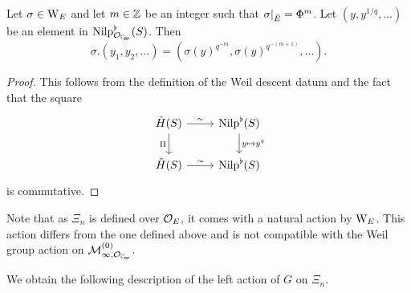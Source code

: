 \documentclass[../main.tex]{subfiles}
\begin{document}
\begin{lem}\label{lem:ExplicitWeilGroupActionOnTildeH}
  Let $\sigma \in \mathrm W_E$ and let $m \in \mathbb{Z}$ be an integer such that
  $\sigma|_{\breve {E}} = \Phi^m$. Let $(y, y^{1/q}, \dots)$ be an element in
  $\Nilp_{\cO_\Cp}^\flat(S)$.
  Then
  \begin{equation*}
    \sigma.(y_1, y_2, \dots) = (\sigma(y)^{q^{-m}}, \sigma(y)^{q^{-(m+1)}}, \dots).
  \end{equation*}
\begin{proof}
  This follows from the definition of the Weil descent datum and the fact that 
  the square
  \begin{equation*}
    \begin{tikzcd}[ampersand replacement=\&]
    	{\tilde H(S)} \& {\Nilp^\flat(S)} \\
    	{\tilde H(S)} \& {\Nilp^\flat(S)}
    	\arrow["\sim", from=1-1, to=1-2]
    	\arrow["\Pi"', from=1-1, to=2-1]
    	\arrow["{y \mapsto y^q}", from=1-2, to=2-2]
    	\arrow["\sim", from=2-1, to=2-2]
    \end{tikzcd}
  \end{equation*}
  is commutative.
\end{proof}
\end{lem}
\begin{rmk} 
  Note that  as $\Xi_n$ is defined over $\mathcal{O}_E$, it comes with a natural action
  by $\mathrm W_E$. This action differs from the one defined above and is not
  compatible with the Weil group action on $\cM_{\infty, \cO_\Cp}^{(0)}$.
\end{rmk}

We obtain the following description of the left action of $G$ on $\Xi_n$.
\end{document}
